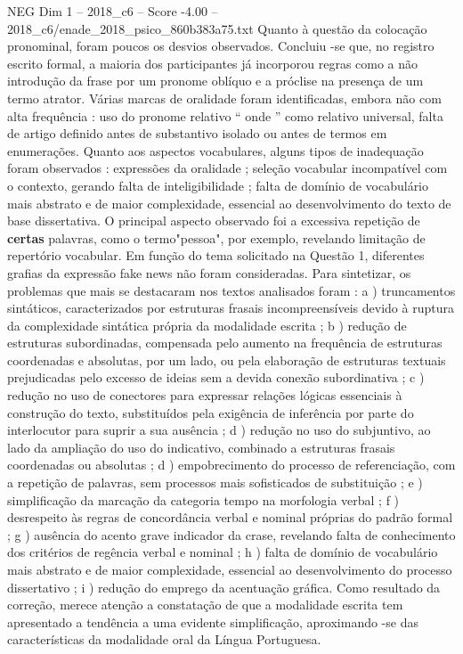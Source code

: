\begin{textsample}{NEG Dim 1 – 2018\_c6 – Score -4.00 – 2018\_c6/enade\_2018\_psico\_860b383a75.txt}
Quanto à questão da colocação pronominal, foram poucos os desvios observados.
Concluiu -se que, no registro escrito formal, a maioria dos participantes já incorporou regras como a não introdução da frase por um pronome oblíquo e a próclise na presença de um termo atrator.
Várias marcas de oralidade foram identificadas, embora não com alta frequência : uso do pronome relativo “ onde ” como relativo universal, falta de artigo definido antes de substantivo isolado ou antes de termos em enumerações.
Quanto aos aspectos vocabulares, alguns tipos de inadequação foram observados : expressões da oralidade ; seleção vocabular incompatível com o contexto, gerando falta de inteligibilidade ; falta de domínio de vocabulário mais abstrato e de maior complexidade, essencial ao desenvolvimento do texto de base dissertativa.
O principal aspecto observado foi a excessiva repetição de \textbf{certas} palavras, como o termo"pessoa", por exemplo, revelando limitação de repertório vocabular.
Em função do tema solicitado na Questão 1, diferentes grafias da expressão fake news não foram consideradas.
Para sintetizar, os problemas que mais se destacaram nos textos analisados foram : a ) truncamentos sintáticos, caracterizados por estruturas frasais incompreensíveis devido à ruptura da complexidade sintática própria da modalidade escrita ; b ) redução de estruturas subordinadas, compensada pelo aumento na frequência de estruturas coordenadas e absolutas, por um lado, ou pela elaboração de estruturas textuais prejudicadas pelo excesso de ideias sem a devida conexão subordinativa ; c ) redução no uso de conectores para expressar relações lógicas essenciais à construção do texto, substituídos pela exigência de inferência por parte do interlocutor para suprir a sua ausência ; d ) redução no uso do subjuntivo, ao lado da ampliação do uso do indicativo, combinado a estruturas frasais coordenadas ou absolutas ; d ) empobrecimento do processo de referenciação, com a repetição de palavras, sem processos mais sofisticados de substituição ; e ) simplificação da marcação da categoria tempo na morfologia verbal ; f ) desrespeito às regras de concordância verbal e nominal próprias do padrão formal ; g ) ausência do acento grave indicador da crase, revelando falta de conhecimento dos critérios de regência verbal e nominal ; h ) falta de domínio de vocabulário mais abstrato e de maior complexidade, essencial ao desenvolvimento do processo dissertativo ; i ) redução do emprego da acentuação gráfica.
Como resultado da correção, merece atenção a constatação de que a modalidade escrita tem apresentado a tendência a uma evidente simplificação, aproximando -se das características da modalidade oral da Língua Portuguesa.

\end{textsample}
